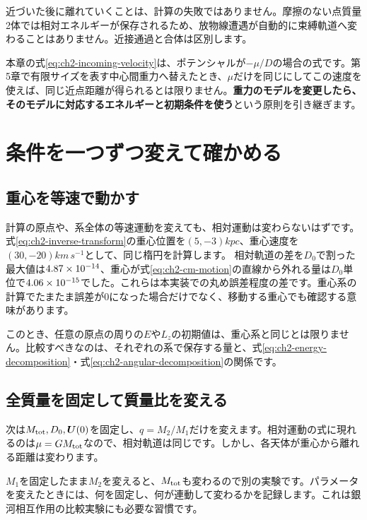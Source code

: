 近づいた後に離れていくことは、計算の失敗ではありません。摩擦のない点質量2体では相対エネルギーが保存されるため、放物線遭遇が自動的に束縛軌道へ変わることはありません。近接通過と合体は区別します。

本章の式\eqref{eq:ch2-incoming-velocity}は、ポテンシャルが$-\mu/D$の場合の式です。第5章で有限サイズを表す中心間重力へ替えたとき、$\mu$だけを同じにしてこの速度を使えば、同じ近点距離が得られるとは限りません。\textbf{重力のモデルを変更したら、そのモデルに対応するエネルギーと初期条件を使う}という原則を引き継ぎます。

\section{条件を一つずつ変えて確かめる}
\label{sec:ch2-experiments}
\subsection{重心を等速で動かす}
計算の原点や、系全体の等速運動を変えても、相対運動は変わらないはずです。式\eqref{eq:ch2-inverse-transform}の重心位置を$(5,-3)\unit{kpc}$、重心速度を$(30,-20)\unit{km\,s^{-1}}$として、同じ楕円を計算します。
相対軌道の差を$D_0$で割った最大値は$4.87\times 10^{-14}$、重心が式\eqref{eq:ch2-cm-motion}の直線から外れる量は$D_0$単位で$4.06\times 10^{-15}$でした。これらは本実装での丸め誤差程度の差です。重心系の計算でたまたま誤差が0になった場合だけでなく、移動する重心でも確認する意味があります。

このとき、任意の原点の周りの$E$や$L_z$の初期値は、重心系と同じとは限りません。比較すべきなのは、それぞれの系で保存する量と、式\eqref{eq:ch2-energy-decomposition}・式\eqref{eq:ch2-angular-decomposition}の関係です。

\subsection{全質量を固定して質量比を変える}
次は$M_{\rm tot},D_0,\boldsymbol U(0)$を固定し、$q=M_2/M_1$だけを変えます。相対運動の式に現れるのは$\mu=GM_{\rm tot}$なので、相対軌道は同じです。しかし、各天体が重心から離れる距離は変わります。
\begin{table}[htbp]
\centering\small
\caption{全質量を固定した質量比の比較。相対軌道の差は、標準の$q=0.5$との差の最大値です。初期相対速度は$0.8v_{\rm c}$に固定しています。}
\label{tab:ch2-mass-ratio}

\end{table}

$M_1$を固定したまま$M_2$を変えると、$M_{\rm tot}$も変わるので別の実験です。パラメータを変えたときには、何を固定し、何が連動して変わるかを記録します。これは銀河相互作用の比較実験にも必要な習慣です。

